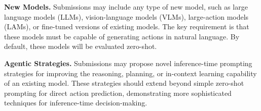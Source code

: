 \textbf{New Models.} Submissions may include any type of new model, such as large language models (LLMs), vision-language models (VLMs), large-action models (LAMs), or fine-tuned versions of existing models. The key requirement is that these models must be capable of generating actions in natural language. By default, these models will be evaluated zero-shot.

\textbf{Agentic Strategies.} Submissions may propose novel inference-time prompting strategies for improving the reasoning, planning, or in-context learning capability of an existing model. These strategies should extend beyond simple zero-shot prompting for direct action prediction, demonstrating more sophisticated techniques for inference-time decision-making.






